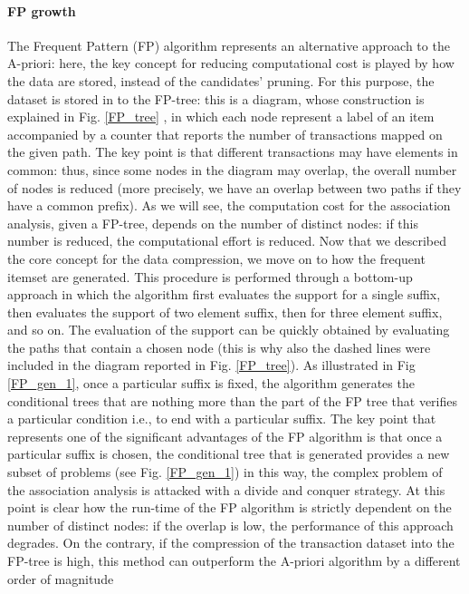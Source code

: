 \documentclass[12pt,%
               a4paper,%
               oneside,openany,%
               titlepage,%
               headinclude,footinclude,%
               BCOR5mm,%
               cleardoublepage=empty,%
               tablecaptionabove,%
               floatperchapter,
               ]{scrreprt}                 %
\begin{document}
\paragraph{FP growth}

The Frequent Pattern (FP) algorithm represents an alternative approach to the A-priori: here, the key concept for reducing computational cost is played by how the data are stored, instead of the candidates' pruning. For this purpose, the dataset is stored in to the FP-tree: this is a diagram, whose construction is explained in Fig. \ref{FP_tree} ,  in which each node represent a label of an item accompanied by a counter that reports the number of transactions mapped on the given path. The key point is that different transactions may have elements in common: thus, since some nodes in the diagram may overlap, the overall number of nodes is reduced (more precisely, we have an overlap between two paths if they have a common prefix). As we will see, the computation cost for the association analysis, given a FP-tree, depends on the number of distinct nodes: if this number is reduced, the computational effort is reduced.  Now that we described the core concept for the data compression, we move on to how the frequent itemset are generated. This procedure is performed through a bottom-up approach in which the algorithm first evaluates the support for a single suffix, then evaluates the support of two element suffix, then for three element suffix, and so on. The evaluation of the support can be quickly obtained by evaluating the paths that contain a chosen node (this is why also the dashed lines were included in the diagram reported in Fig. \ref{FP_tree}). As illustrated in Fig \ref{FP_gen_1}, once a particular suffix is fixed, the algorithm generates the conditional trees that are nothing more than the part of the FP tree that verifies a particular condition i.e., to end with a particular suffix. The key point that represents one of the significant advantages of the FP algorithm is that once a particular suffix is chosen, the conditional tree that is generated provides a new subset of problems (see Fig. \ref{FP_gen_1}) in this way, the complex problem of the association analysis is attacked with a divide and conquer strategy. At this point is clear how the run-time of the FP algorithm is strictly dependent on the number of distinct nodes: if the overlap is low, the performance of this approach degrades. On the contrary, if the compression of the transaction dataset into the FP-tree is high, this method can outperform the A-priori algorithm by a different order of magnitude \cite{tan2019introduction}
\end{document}
